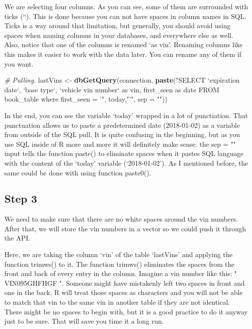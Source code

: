\documentclass[]{book}
\newenvironment{Shaded}{\begin{snugshade}}{\end{snugshade}}
\newcommand{\CommentTok}[1]{\textcolor[rgb]{0.56,0.35,0.01}{\textit{#1}}}
\newcommand{\DataTypeTok}[1]{\textcolor[rgb]{0.13,0.29,0.53}{#1}}
\newcommand{\KeywordTok}[1]{\textcolor[rgb]{0.13,0.29,0.53}{\textbf{#1}}}
\newcommand{\NormalTok}[1]{#1}
\newcommand{\StringTok}[1]{\textcolor[rgb]{0.31,0.60,0.02}{#1}}
\begin{document}
We are selecting four columns. As you can see, some of them are surrounded with ticks (``). This is done because you can not have spaces in column names in SQL. Ticks is a way around that limitation, but generally, you should avoid using spaces when naming columns in your databases, and everywhere else as well. Also, notice that one of the columns is renamed `as vin'. Renaming columns like this makes it easier to work with the data later. You can rename any of them if you want.

\begin{Shaded}
\begin{Highlighting}[]
\CommentTok{# Pulling.}
\NormalTok{lastVins <-}\StringTok{ }\KeywordTok{dbGetQuery}\NormalTok{(connection, }
\KeywordTok{paste}\NormalTok{(}\StringTok{"SELECT}
\StringTok{`expiration date`, }
\StringTok{`base type`,}
\StringTok{`vehicle vin number` as vin, }
\StringTok{first_seen as date }
\StringTok{FROM book_table }
\StringTok{where first_seen = '"}\NormalTok{, today,}\StringTok{"'"}\NormalTok{,}
\DataTypeTok{sep =} \StringTok{""}\NormalTok{))}
\end{Highlighting}
\end{Shaded}

In the end, you can see the variable `today' wrapped in a lot of punctiation. That punctuation allows us to paste a predetermined date (2018-01-02) as a variable from outside of the SQL pull. It is quite confusing in the beginning, but as you use SQL inside of R more and more it will definitely make sense. the sep = "" input tells the function paste() to eliminate spaces when it pastes SQL language with the content of the `today' variable (`2018-01-02'). As I mentioned before, the same could be done with using function paste0().

\hypertarget{step-3-1}{%
\subsection{Step 3}\label{step-3-1}}

We need to make sure that there are no white spaces around the vin numbers. After that, we will store the vin numbers in a vector so we could push it through the API.

Here, we are taking the column `vin' of the table `lastVins' and applying the function trimws() to it. The function trimws() eliminates the spaces from the front and back of every entry in the column. Imagine a vin number like this: " VIN095GHFHGF ". Someone might have mistakenly left two spaces in front and one in the back. R will treat those spaces as characters and you will not be able to match that vin to the same vin in another table if they are not identical. There might be no spaces to begin with, but it is a good practice to do it anyway just to be sure. That will save you time it a long run.
\end{document}
